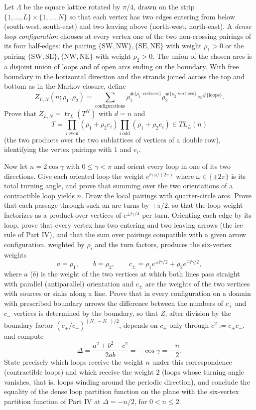 \begin{exercise}
Let $\Lambda$ be the square lattice rotated by $\pi/4$, drawn on the strip $\{1,\dots,L\}\times\{1,\dots,N\}$ so that each vertex has two edges entering from below (south-west, south-east) and two leaving above (north-west, north-east). A \emph{dense loop configuration} chooses at every vertex one of the two non-crossing pairings of its four half-edges: the pairing $\{\mathrm{SW},\mathrm{NW}\},\{\mathrm{SE},\mathrm{NE}\}$ with weight $\rho_1>0$ or the pairing $\{\mathrm{SW},\mathrm{SE}\},\{\mathrm{NW},\mathrm{NE}\}$ with weight $\rho_2>0$. The union of the chosen arcs is a disjoint union of loops and of open arcs ending on the boundary. With free boundary in the horizontal direction and the strands joined across the top and bottom as in the Markov closure, define
\[
Z_{L,N}(n;\rho_1,\rho_2)=\sum_{\text{configurations}}\rho_1^{\#\{\rho_1\text{-vertices}\}}\rho_2^{\#\{\rho_2\text{-vertices}\}}\,n^{\#\{\text{loops}\}} .
\]
Prove that $Z_{L,N}=\operatorname{tr}_L(T^N)$ with $d=n$ and
\[
T=\prod_{i\ \mathrm{even}}(\rho_1+\rho_2e_i)\prod_{i\ \mathrm{odd}}(\rho_1+\rho_2e_i)\in TL_L(n)
\]
(the two products over the two sublattices of vertices of a double row), identifying the vertex pairings with $1$ and $e_i$.

Now let $n=2\cos\gamma$ with $0\le\gamma<\pi$ and orient every loop in one of its two directions. Give each oriented loop the weight $e^{\ii\gamma\,\omega/(2\pi)}$ where $\omega\in\{\pm2\pi\}$ is its total turning angle, and prove that summing over the two orientations of a contractible loop yields $n$. Draw the local pairings with quarter-circle arcs. Prove that each passage through such an arc turns by $\pm\pi/2$, so that the loop weight factorizes as a product over vertices of $e^{\pm\ii\gamma/4}$ per turn. Orienting each edge by its loop, prove that every vertex has two entering and two leaving arrows (the ice rule of Part IV), and that the sum over pairings compatible with a given arrow configuration, weighted by $\rho_i$ and the turn factors, produces the six-vertex weights
\[
a=\rho_1,\qquad b=\rho_2,\qquad c_\pm=\rho_1e^{\pm\ii\gamma/2}+\rho_2e^{\mp\ii\gamma/2},
\]
where $a$ ($b$) is the weight of the two vertices at which both lines pass straight with parallel (antiparallel) orientation and $c_\pm$ are the weights of the two vertices with sources or sinks along a line. Prove that in every configuration on a domain with prescribed boundary arrows the difference between the numbers of $c_+$ and $c_-$ vertices is determined by the boundary, so that $Z$, after division by the boundary factor $(c_+/c_-)^{(N_+-N_-)/2}$, depends on $c_\pm$ only through $c^2:=c_+c_-$, and compute
\[
\Delta=\frac{a^2+b^2-c^2}{2ab}=-\cos\gamma=-\frac n2 .
\]
State precisely which loops receive the weight $n$ under this correspondence (contractible loops) and which receive the weight $2$ (loops whose turning angle vanishes, that is, loops winding around the periodic direction), and conclude the equality of the dense loop partition function on the plane with the six-vertex partition function of Part IV at $\Delta=-n/2$, for $0<n\le2$.
\end{exercise}

